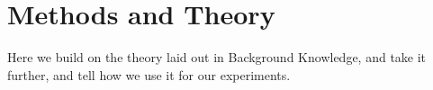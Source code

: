 \chapter{Methods and Theory}
\label{MethodsCh}

Here we build on the theory laid out in Background Knowledge, and take it
further, and tell how we use it for our experiments.
